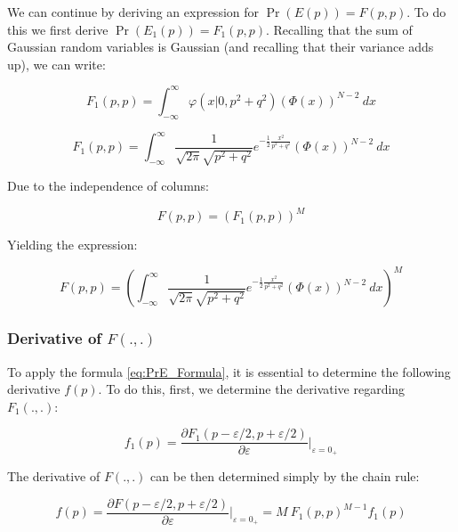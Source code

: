 \documentclass{article}
\theoremstyle{definition}
\begin{document}
We can continue by deriving an expression for $\Pr(E(p)) = F(p,p)$. To do this we first derive $\Pr(E_1(p)) = F_1(p,p)$.
Recalling that the sum of Gaussian random variables is Gaussian (and recalling that their variance adds up), we can write:

\begin{equation}
    F_1(p,p) = 
    \int_{-\infty}^\infty \varphi(x|0,p^2+q^2) (\Phi(x))^{N-2} \ d x
\end{equation}

\begin{equation}
    F_1(p,p) = 
    \int_{-\infty}^\infty \frac{1}{\sqrt{2 \pi} \sqrt{p^2+q^2}} e^{-\frac{1}{2}\frac{x^2}{p^2+q^2}} (\Phi(x))^{N-2} \ d x
\end{equation}

Due to the independence of columns:

\begin{equation}
    F(p,p) 
    =
    \left ( F_1(p,p) \right )^M
\end{equation}

Yielding the expression:

\begin{equation}
    F(p,p) = 
    \left ( 
    \int_{-\infty}^\infty \frac{1}{\sqrt{2 \pi} \sqrt{p^2+q^2}} e^{-\frac{1}{2}\frac{x^2}{p^2+q^2}} (\Phi(x))^{N-2} \ d x
    \right )^M
\end{equation}

\subsubsection{Derivative of $F(.,.)$}

To apply the formula \eqref{eq:PrE_Formula}, it is essential to determine the following derivative $f(p)$. To do this, first, we determine the derivative regarding $F_1(.,.)$:

\begin{equation}
    f_1(p)
    =
    \frac{\partial
    F_1(p - \varepsilon/2, p + \varepsilon/2) 
    }{\partial \varepsilon}
    \Bigg |_{\varepsilon=0_+}
\end{equation}

The derivative of $F(.,.)$ can be then determined simply by the chain rule:

\begin{equation}
    f(p)
    =
    \frac{\partial
    F(p - \varepsilon/2, p + \varepsilon/2) 
    }{\partial \varepsilon}
    \Bigg |_{\varepsilon=0_+}
    =
    M \  F_1(p,p)^{M-1} f_1(p)
\end{equation}
\end{document}
